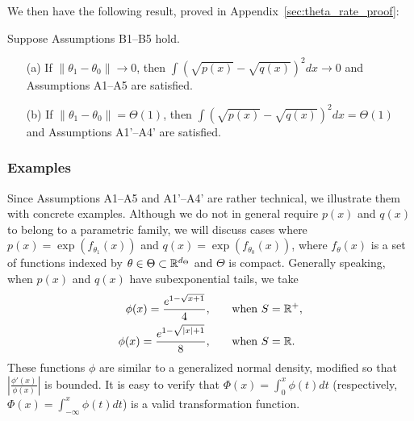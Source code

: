 \documentclass{article}
\begin{document}
We then have the following result, proved in Appendix~\ref{sec:theta_rate_proof}:
\begin{proposition}
\label{prop:theta_rate}
Suppose Assumptions B1--B5 hold.
\begin{enumerate}
\item[(a)] If $\| \theta_1 - \theta_0 \| \rightarrow 0$, then $\int (\sqrt{p(x)} - \sqrt{q(x)})^2 dx \rightarrow 0$ and Assumptions A1--A5 are satisfied. 
\item[(b)] If $\| \theta_1 - \theta_0\| = \Theta(1)$, then $\int (\sqrt{p(x)} - \sqrt{q(x)})^2 dx = \Theta(1)$ and Assumptions A1'--A4' are satisfied.
\end{enumerate}
\end{proposition}


\subsubsection{Examples}
\label{SubsecExa}

Since Assumptions A1--A5 and A1'--A4' are rather technical, we illustrate them with concrete examples. Although we do not in general require $p(x)$ and $q(x)$ to belong to a parametric family, we will discuss cases where $p(x) = \exp( f_{\theta_1}(x))$ and $q(x) = \exp( f_{\theta_0}(x))$, where $f_{\theta}(x)$ is a set of functions indexed by $\theta \in \Theta \subset {\mathbb R}^{d_{\Theta}}$ and $\Theta$ is compact. Generally speaking, when $p(x)$ and $q(x)$ have subexponential tails, we take
\begin{align}
\phi(x) = \frac{e^{1-\sqrt{x+1}}}{4},  & 
     \qquad \textrm{when $S = {\mathbb R}^+$}, \label{eqn:phi_defn1} \\ 
\phi(x) = \frac{e^{1-\sqrt{|x|+1}}}{8}, & 
   \qquad \textrm{when $S = {\mathbb R}$.} \label{eqn:phi_defn2}
\end{align}
These functions $\phi$ are similar to a generalized normal density, modified so that $\left| \frac{\phi'(x)}{\phi(x)} \right|$ is bounded. It is easy to verify that $\Phi(x) = \int_0^x \phi(t) dt$ (respectively, $\Phi(x) = \int_{-\infty}^x \phi(t) dt$) is a valid transformation function.
\end{document}
